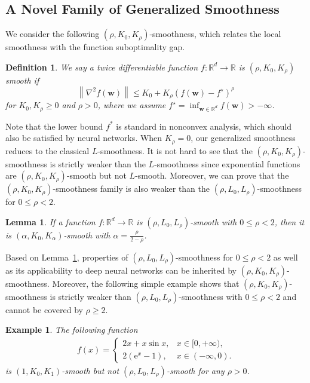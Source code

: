 \documentclass{article}
\newtheorem{lemma}{Lemma}
\newtheorem{example}{Example}
\newtheorem{definition}{Definition}
\newcommand{\Norm}[1]{\left\|#1\right\|}
\newcommand{\Kr}{K_{\rho}}
\newcommand{\bw}{\mathbf{w}}
\newcommand{\RR}{\mathbb{R}}
\begin{document}
\subsection{A Novel Family of Generalized Smoothness}
We consider the following $(\rho, K_0, K_\rho)$-smoothness, which relates the local smoothness with the function suboptimality gap.
\begin{definition}\label{defi:K_smooth}
    We say a twice differentiable function $f:\mathbb{R}^d\to\mathbb{R}$ is $\left(\rho,K_0,\Kr\right)$ smooth if
    \begin{equation}\label{eq:defi_K_smoothn}
        \Norm{\nabla^2 f(\bw)}\leq K_0+\Kr\left(f(\bw)-f^\star\right)^\rho
    \end{equation}
    for $K_0,\Kr\geq0$ and $\rho>0$,
    where we assume $f^\star=\inf_{\bw \in \RR^d} f(\bw) > -\infty$.
\end{definition}
Note that the lower bound $f^*$ is standard in nonconvex analysis, which should also be satisfied by neural networks.
When $\Kr=0$, our generalized smoothness reduces to the classical $L$-smoothness. It is not hard to see that the $(\rho,K_0,\Kr)$-smoothness is strictly weaker than the $L$-smoothness since exponential functions are $(\rho,K_0,\Kr)$-smooth but not $L$-smooth. Moreover, we can prove that the $(\rho,K_0,\Kr)$-smoothness family is also weaker than the $(\rho,L_0,L_\rho)$-smoothness for $0\leq\rho<2$.


\begin{lemma}\label{lem:L_in_K_smooth}
    If a function $f:\RR^d \to \RR$ is $(\rho, L_0, L_\rho)$-smooth with $0\leq \rho<2$, then it is $(\alpha, K_0, K_\alpha)$-smooth with $\alpha=\frac{\rho}{2-\rho}$.
\end{lemma}
Based on Lemma~\ref{lem:L_in_K_smooth}, properties of $(\rho,L_0,L_\rho)$-smoothness for $0\le \rho<2$ as well as its applicability to deep neural networks can be inherited by $(\rho,K_0,\Kr)$-smoothness. Moreover, the following simple example shows that $(\rho,K_0,\Kr)$-smoothness is strictly weaker than 
$(\rho,L_0,L_\rho)$-smoothness with $0\leq\rho<2$ and cannot be covered by $\rho\ge 2$.


\begin{example}\label{example:trigonometric}
    The following function
    \begin{align*}
    f(x) = \left\{ \begin{array}{cc}
       2x + x\sin x , & x \in [0,+\infty), \\
       2(\mathrm{e}^x - 1) ,  & x \in (-\infty,0).
    \end{array} \right. 
\end{align*}
    is $(1,K_0,K_1)$-smooth but not $(\rho,L_0,L_\rho)$-smooth for any $\rho>0$.
\end{example}
\end{document}
